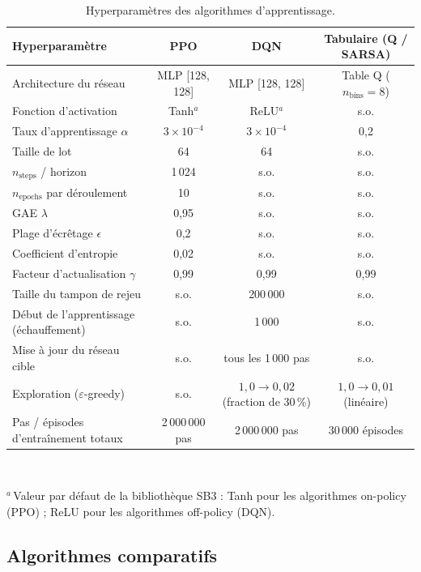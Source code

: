 \documentclass[11pt,a4paper]{article}
\begin{document}
\begin{table}[H]
\centering
\caption{Hyperparamètres des algorithmes d'apprentissage.}
\label{tab:hyper}
\footnotesize
\setlength{\tabcolsep}{5pt}
\begin{tabular}{lccc}
\toprule
\textbf{Hyperparamètre} & \textbf{PPO} & \textbf{DQN} & \textbf{Tabulaire (Q / SARSA)} \\
\midrule
Architecture du réseau         & MLP [128, 128] & MLP [128, 128] & Table Q ($n_{\text{bins}}=8$) \\
Fonction d'activation          & Tanh$^{a}$     & ReLU$^{a}$     & s.o. \\
Taux d'apprentissage $\alpha$  & $3\times10^{-4}$ & $3\times10^{-4}$ & 0,2   \\
Taille de lot                  & 64             & 64             & s.o. \\
$n_{\mathrm{steps}}$ / horizon & 1\,024         & s.o. & s.o. \\
$n_{\mathrm{epochs}}$ par déroulement & 10      & s.o. & s.o. \\
GAE $\lambda$                  & 0,95           & s.o. & s.o. \\
Plage d'écrêtage $\epsilon$    & 0,2            & s.o. & s.o. \\
Coefficient d'entropie         & 0,02           & s.o. & s.o. \\
Facteur d'actualisation $\gamma$ & 0,99         & 0,99           & 0,99    \\
Taille du tampon de rejeu      & s.o. & 200\,000       & s.o. \\
Début de l'apprentissage (échauffement) & s.o. & 1\,000 & s.o. \\
Mise à jour du réseau cible    & s.o. & tous les 1\,000 pas & s.o. \\
Exploration ($\varepsilon$-greedy) & s.o. & $1{,}0\to0{,}02$ (fraction de 30\,\%) & $1{,}0\to0{,}01$ (linéaire) \\
Pas / épisodes d'entraînement totaux & 2\,000\,000 pas & 2\,000\,000 pas & 30\,000 épisodes \\
\bottomrule
\end{tabular}
\\[4pt]
\raggedright
\footnotesize $^{a}$\,Valeur par défaut de la bibliothèque SB3 : Tanh pour les algorithmes on-policy (PPO) ; ReLU pour les algorithmes off-policy (DQN).\\
\end{table}

\subsection{Algorithmes comparatifs}
\end{document}
